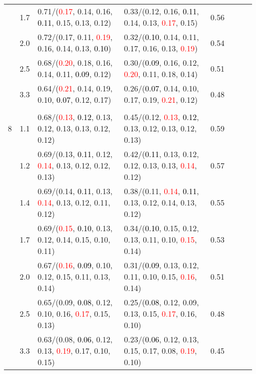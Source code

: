 \documentclass[10pt,a4paper]{report}
\begin{document}
\begin{table}[!htbp]
\begin{center}
{\begin{tabular}{ccllcccc}
			&1.7&0.71/(\textcolor{red}{0.17}, 0.14, 0.16, \textcolor{black}{0.11}, 0.15, 0.13, 0.12)&0.33/(0.12, 0.16, \textcolor{black}{0.11}, 0.14, 0.13, \textcolor{red}{0.17}, 0.15)&0.56\\
			&2.0&0.72/(0.17, 0.11, \textcolor{red}{0.19}, 0.16, 0.14, 0.13, \textcolor{black}{0.10})&0.32/(\textcolor{black}{0.10}, 0.14, 0.11, 0.17, 0.16, 0.13, \textcolor{red}{0.19})&0.54\\
			&2.5&0.68/(\textcolor{red}{0.20}, 0.18, 0.16, 0.14, 0.11, \textcolor{black}{0.09}, 0.12)&0.30/(\textcolor{black}{0.09}, 0.16, 0.12, \textcolor{red}{0.20}, 0.11, 0.18, 0.14)&0.51\\
			&3.3&0.64/(\textcolor{red}{0.21}, 0.14, 0.19, 0.10, \textcolor{black}{0.07}, 0.12, 0.17)&0.26/(\textcolor{black}{0.07}, 0.14, 0.10, 0.17, 0.19, \textcolor{red}{0.21}, 0.12)&0.48\\
			&&&&\\
			8			&1.1&0.68/(\textcolor{red}{0.13}, \textcolor{black}{0.12}, 0.13, 0.12, 0.13, 0.13, 0.12, 0.12)&0.45/(0.12, \textcolor{red}{0.13}, \textcolor{black}{0.12}, 0.13, 0.12, 0.13, 0.12, 0.13)&0.59\\
			&1.2&0.69/(0.13, \textcolor{black}{0.11}, 0.12, \textcolor{red}{0.14}, 0.13, 0.12, 0.12, 0.13)&0.42/(\textcolor{black}{0.11}, 0.13, 0.12, 0.12, 0.13, 0.13, \textcolor{red}{0.14}, 0.12)&0.57\\
			&1.4&0.69/(0.14, \textcolor{black}{0.11}, 0.13, \textcolor{red}{0.14}, 0.13, 0.12, 0.11, 0.12)&0.38/(0.11, \textcolor{red}{0.14}, \textcolor{black}{0.11}, 0.13, 0.12, 0.14, 0.13, 0.12)&0.55\\
			&1.7&0.69/(\textcolor{red}{0.15}, \textcolor{black}{0.10}, 0.13, 0.12, 0.14, 0.15, 0.10, 0.11)&0.34/(\textcolor{black}{0.10}, 0.15, 0.12, 0.13, 0.11, 0.10, \textcolor{red}{0.15}, 0.14)&0.53\\
			&2.0&0.67/(\textcolor{red}{0.16}, \textcolor{black}{0.09}, 0.10, 0.12, 0.15, 0.11, 0.13, 0.14)&0.31/(\textcolor{black}{0.09}, 0.13, 0.12, 0.11, 0.10, 0.15, \textcolor{red}{0.16}, 0.14)&0.51\\
			&2.5&0.65/(0.09, \textcolor{black}{0.08}, 0.12, 0.10, 0.16, \textcolor{red}{0.17}, 0.15, 0.13)&0.25/(\textcolor{black}{0.08}, 0.12, 0.09, 0.13, 0.15, \textcolor{red}{0.17}, 0.16, 0.10)&0.48\\
			&3.3&0.63/(0.08, \textcolor{black}{0.06}, 0.12, 0.13, \textcolor{red}{0.19}, 0.17, 0.10, 0.15)&0.23/(\textcolor{black}{0.06}, 0.12, 0.13, 0.15, 0.17, 0.08, \textcolor{red}{0.19}, 0.10)&0.45\\
			\bottomrule
		\end{tabular}}
	\end{center}
\end{table}
\end{document}
